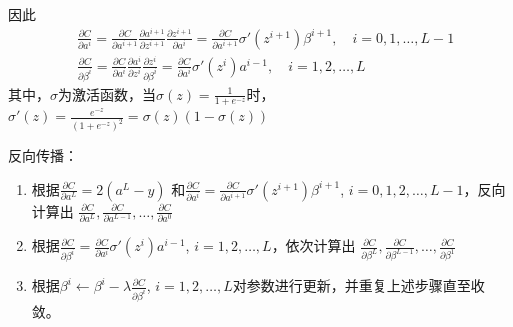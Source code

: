 \documentclass[11pt]{article}
\begin{document}
因此
\begin{align*}
&\frac{\partial C}{\partial a^i}=\frac{\partial C}{\partial a^{i+1}}\frac{\partial a^{i+1}}{\partial z^{i+1}}\frac{\partial z^{i+1}}{\partial a^i}=
\frac{\partial C}{\partial a^{i+1}}\sigma'(z^{i+1})\beta^{i+1}, \quad i=0,1,\dots,L-1\\
&\frac{\partial C}{\partial\beta^i}=\frac{\partial C}{\partial a^i}\frac{\partial a^i}{\partial z^i}\frac{\partial z^i}{\partial\beta^i}=\frac{\partial C}{\partial a^i}
\sigma'(z^i)a^{i-1},\quad i=1,2,\dots,L
\end{align*}
其中，\(\sigma\)为激活函数，当\(\sigma(z)=\frac{1}{1+e^{-z}}\)时，\(\sigma'(z)=\frac{e^{-z}}{(1+e^{-z})^2}=\sigma(z)(1-\sigma(z))\)

反向传播：
\begin{enumerate}
\item 根据\(\frac{\partial C}{\partial a^L}=2(a^L-y)\)
和\(\frac{\partial C}{\partial a^i}=\frac{\partial C}{\partial a^{i+1}}\sigma'(z^{i+1})\beta^{i+1}\), \(i=0,1,2,\dots,L-1\)，反向计算出
\(\frac{\partial C}{\partial a^L},\frac{\partial C}{\partial a^{L-1}},\dots,\frac{\partial C}{\partial a^0}\)
\item 根据\(\frac{\partial C}{\partial\beta^i}=\frac{\partial C}{\partial a^i}\sigma'(z^i)a^{i-1}\), \(i=1,2,\dots,L\)，依次计算出
\(\frac{\partial C}{\partial\beta^L},\frac{\partial C}{\partial\beta^{L-1}},\dots,\frac{\partial C}{\partial\beta^1}\)
\item 根据\(\beta^i\leftarrow\beta^i-\lambda\frac{\partial C}{\partial\beta^i}\), \(i=1,2,\dots,L\)对参数进行更新，并重复上述步骤直至收敛。
\end{enumerate}
\end{document}
